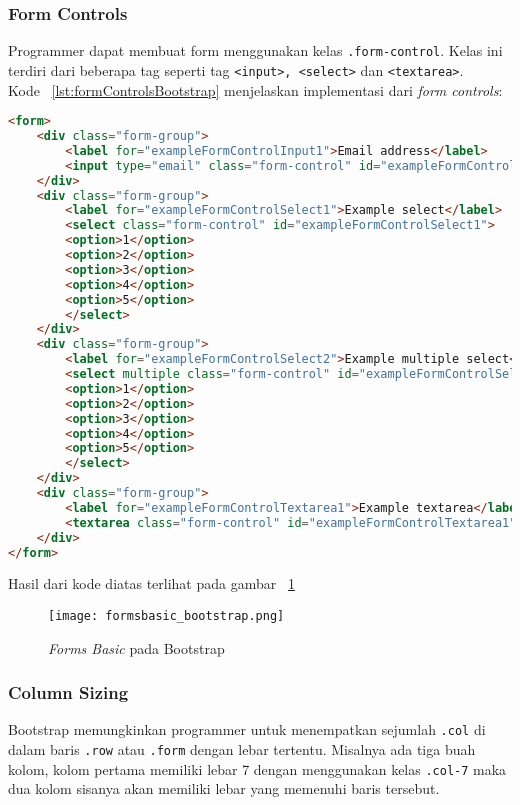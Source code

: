 \subsubsection{Form Controls}
Programmer dapat membuat form menggunakan kelas \texttt{.form-control}. Kelas ini terdiri dari beberapa tag seperti tag \texttt{<input>, <select>} dan \texttt{<textarea>}.\\
Kode ~\ref{lst:formControlsBootstrap} menjelaskan implementasi dari \textit{form controls}:
\begin{lstlisting}[style=customhtml, language=HTML,  basicstyle=\ttfamily, frame=single, columns=fullflexible, keepspaces=true, breaklines=true, showstringspaces=false, label={lst:formControlsBootstrap}, caption=Form controls pada bootstrap 4.]  
<form>
	<div class="form-group">
		<label for="exampleFormControlInput1">Email address</label>
		<input type="email" class="form-control" id="exampleFormControlInput1" placeholder="name@example.com">
	</div>
	<div class="form-group">
		<label for="exampleFormControlSelect1">Example select</label>
		<select class="form-control" id="exampleFormControlSelect1">
		<option>1</option>
		<option>2</option>
		<option>3</option>
		<option>4</option>
		<option>5</option>
		</select>
	</div>
	<div class="form-group">
		<label for="exampleFormControlSelect2">Example multiple select</label>
		<select multiple class="form-control" id="exampleFormControlSelect2">
		<option>1</option>
		<option>2</option>
		<option>3</option>
		<option>4</option>
		<option>5</option>
		</select>
	</div>
	<div class="form-group">
		<label for="exampleFormControlTextarea1">Example textarea</label>
		<textarea class="form-control" id="exampleFormControlTextarea1" rows="3"></textarea>
	</div>
</form>
\end{lstlisting}
Hasil dari kode diatas terlihat pada gambar ~\ref{fig:formBootstrap}
\begin{figure} [H]
	\centering  
	\texttt{[image: formsbasic\_bootstrap.png]}  
	\caption{\textit{Forms Basic} pada Bootstrap} 
	\label{fig:formBootstrap}
\end{figure} 
\subsubsection{Column Sizing}
Bootstrap memungkinkan programmer untuk menempatkan sejumlah \texttt{.col} di dalam baris \texttt{.row} atau \texttt{.form} dengan lebar tertentu. Misalnya ada tiga buah kolom, kolom pertama memiliki lebar 7 dengan menggunakan kelas \texttt{.col-7} maka dua kolom sisanya akan memiliki lebar yang  memenuhi baris tersebut.
 
